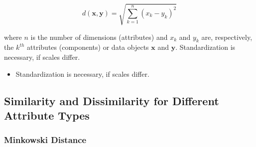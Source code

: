 \[
d(\mathbf{x}, \mathbf{y}) = \sqrt{\sum_{k=1}^{n}(x_k - y_k)^2}
\]

where $n$ is the number of dimensions (attributes) and $x_k$ and $y_k$ are, respectively, the $k^{th}$ attributes (components) or data objects $\mathbf{x}$ and $\mathbf{y}$. Standardization is necessary, if scales differ.

\begin{itemize}
    \item Standardization is necessary, if scales differ.
\end{itemize}

\subsection{Similarity and Dissimilarity for Different Attribute Types}





\subsubsection{Minkowski Distance}

